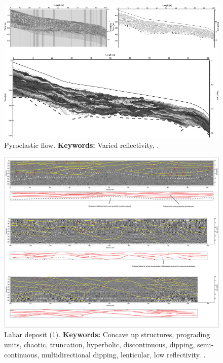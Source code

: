 \begin{landscape}
    \begin{figure}[h!]
    \centering
    \includegraphics[width=0.9\linewidth]{Figures/0.2GPR/Gomez_2009_pyro.jpg}
    \caption[Pyroclastic flow.]{Pyroclastic flow. \textbf{Keywords: } Varied reflectivity, \citep{Gomez-2009-1}.}
    \label{fig:Gomez2009-1}
\end{figure}
\end{landscape}
\clearpage

\begin{figure}[h!]
    \centering
    \includegraphics[width=0.9\linewidth]{Figures/0.2GPR/Gomez2018_1.jpg}
    \caption[Lahar deposit (1).]{Lahar deposit (1). \textbf{Keywords: } Concave up structures, prograding units, chaotic, truncation, hyperbolic, discontinuous, dipping, semi-continuous, multidirectional dipping, lenticular, low reflectivity.
   \citep{Gomez2018}.}
    \label{fig:Gomez2018-1}
\end{figure}

